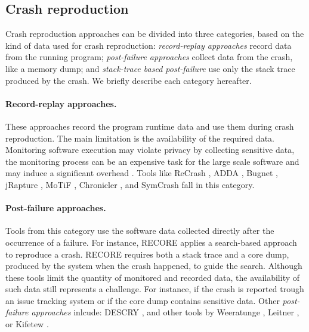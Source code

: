 
\subsection{Crash reproduction}

Crash reproduction approaches can be divided into three categories, based on the kind of data used for crash reproduction: \emph{record-replay approaches} record data from the running program; \emph{post-failure approaches} collect data from the crash, like a memory dump; and \emph{stack-trace based post-failure} use only the stack trace produced by the crash. We briefly describe each category hereafter.

\paragraph{Record-replay approaches.}

These approaches record the program runtime data and use them during crash reproduction. The main limitation is the availability of the required data. Monitoring software execution may violate privacy by collecting sensitive data, the monitoring process can be an expensive task for the large scale software and may induce a significant overhead \cite{Chen2015, Nayrolles2017, Rossler2013}.
%
Tools like \textrm{ReCrash} \cite{Artzi2008}, \textrm{ADDA} \cite{Clause2007}, \textrm{Bugnet} \cite{Narayanasamy2005}, \textrm{jRapture} \cite{Steven2000}, \textrm{MoTiF} \cite{Gomez2016}, \textrm{Chronicler} \cite{Bell2013}, and \textrm{SymCrash} \cite{Cao2014} fall in this category.

\paragraph{Post-failure approaches.}

Tools from this category use the software data collected directly after the occurrence of a failure. For instance, \textrm{RECORE} \cite{Rossler2013} applies a search-based approach to reproduce a crash. 
\textrm{RECORE} requires both a stack trace and a core dump, produced by the system when the crash happened, to guide the search. 
Although these tools limit the quantity of monitored and recorded data, the availability of such data still represents a challenge. For instance, if the crash is reported trough an issue tracking system or if the core dump contains sensitive data. 
%
Other \textit{post-failure approaches} inlcude: \textrm{DESCRY} \cite{YZW17descry}, and other tools by Weeratunge \etal \cite{Weeratunge2010}, Leitner \etal \cite{Leitner2007, Leitner2009}, or Kifetew \etal \cite{Kifetew2013, Kifetew2014}.

